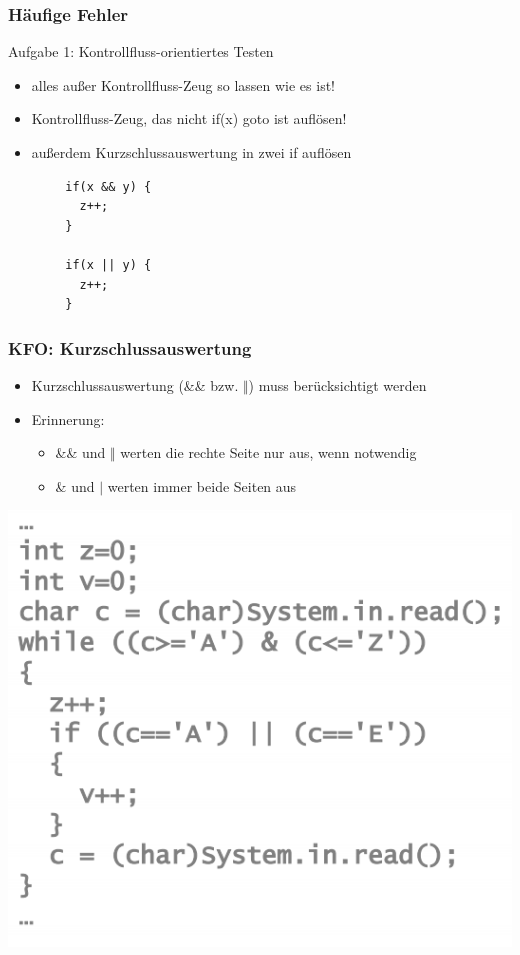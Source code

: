 \documentclass[18pt]{beamer}
\begin{document}
	\begin{frame}[fragile]
		\frametitle{Häufige Fehler}
		\begin{block}{Aufgabe 1: Kontrollfluss-orientiertes Testen}
			\begin{itemize}
				\pause 
				\item alles außer Kontrollfluss-Zeug so lassen wie es ist! \pause
				\item Kontrollfluss-Zeug, das nicht if(x) goto ist auflösen! \pause
				\item außerdem Kurzschlussauswertung in zwei if auflösen 
			\end{itemize}
		\end{block}
		\begin{verbatim}
		if(x && y) {
		  z++;
		}
		
		if(x || y) {
		  z++;
		}
		\end{verbatim}
\end{frame}

	\begin{frame}
		\frametitle{KFO: Kurzschlussauswertung}
		\begin{itemize}
			\item Kurzschlussauswertung (\&\& bzw. $\Vert$) muss berücksichtigt werden \pause
			\item Erinnerung: 
			\begin{itemize}
				\item \&\& und $\Vert$ werten die rechte Seite nur aus, wenn notwendig
				\item \& und $\vert$ werten immer beide Seiten aus \pause
			\end{itemize}
		\end{itemize}
		\centering \includegraphics[scale=0.4]{./pics/tut6/code.png}
	\end{frame}
\end{document}
